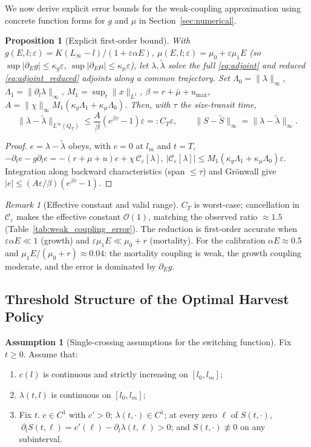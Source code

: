 \documentclass[pdflatex,sn-mathphys-num]{sn-jnl}
\newcommand{\Ord}{\mathcal{O}}
\newcommand{\Qt}{Q_T}
\theoremstyle{thmstyleone}
\newtheorem{proposition}[theorem]{Proposition}
\theoremstyle{definition}
\newtheorem{assumption}[theorem]{Assumption}
\theoremstyle{remark}
\newtheorem{remark}[theorem]{Remark}
\begin{document}
We now derive explicit error bounds for the weak-coupling approximation using concrete function forms for $g$ and $\mu$ in Section~\ref{sec:numerical}.
\begin{proposition}[Explicit first-order bound]\label{prop:wcbound}
With $g(E,l;\varepsilon)=K(L_\infty-l)/(1+\varepsilon\alpha E)$,
$\mu(E,l;\varepsilon)=\mu_0+\varepsilon\mu_1E$ (so $\sup|\partial_E g|\le\kappa_g\varepsilon$,
$\sup|\partial_E\mu|\le\kappa_\mu\varepsilon$), let $\lambda,\tilde\lambda$ solve the
full \eqref{eq:adjoint} and reduced \eqref{eq:adjoint_reduced} adjoints along a
common trajectory. Set $\Lambda_0=\|\lambda\|_\infty$,
$\Lambda_1=\|\partial_l\lambda\|_\infty$, $M_1=\sup_t\|x\|_{L^1}$,
$\beta=r+\bar\mu+u_{\max}$, $A=\|\chi\|_\infty M_1(\kappa_g\Lambda_1+\kappa_\mu\Lambda_0)$.
Then, with $\tau$ the size-transit time,
\[
\|\lambda-\tilde\lambda\|_{L^\infty(\Qt)}\le\frac{A}{\beta}(e^{\beta\tau}-1)\varepsilon=:C_T\varepsilon,
\qquad \|S-\tilde S\|_\infty=\|\lambda-\tilde\lambda\|_\infty .
\]
\end{proposition}
\begin{proof}
$e=\lambda-\tilde\lambda$ obeys, with $e=0$ at $l_m$ and $t=T$,
$-\partial_t e-g\partial_l e=-(r+\mu+u)e+\chi\,\mathcal C_\varepsilon[\lambda]$,
$|\mathcal C_\varepsilon[\lambda]|\le M_1(\kappa_g\Lambda_1+\kappa_\mu\Lambda_0)\varepsilon$.
Integration along backward characteristics (span $\le\tau$) and Gr\"onwall give
$|e|\le(A\varepsilon/\beta)(e^{\beta\tau}-1)$.
\end{proof}
\begin{remark}[Effective constant and valid range]\label{rem:validrange}
$C_T$ is worst-case; cancellation in $\mathcal C_\varepsilon$ makes the effective
constant $\Ord(1)$, matching the observed ratio $\approx1.5$
(Table~\ref{tab:weak_coupling_error}). The reduction is first-order accurate when
$\varepsilon\alpha E\ll1$ (growth) and $\varepsilon\mu_1E\ll\mu_0+r$ (mortality).
For the calibration $\alpha E\approx0.5$ and $\mu_1E/(\mu_0+r)\approx0.04$: the
mortality coupling is weak, the growth coupling moderate, and the error is
dominated by $\partial_E g$.
\end{remark}

\subsection{Threshold Structure of the Optimal Harvest Policy}
\label{subsec:threshold}

\begin{assumption}[Single-crossing assumptions for the switching function]
\label{ass:switching}
Fix $t\ge 0$. Assume that:
\begin{enumerate}[label=(\roman*)]
\item $c(l)$ is continuous and strictly increasing on $[l_0,l_m]$;
\item $\lambda(t,l)$ is continuous on $[l_0,l_m]$;
\item\label{ass:lsc} Fix $t$. $c\in C^1$ with $c'>0$; $\lambda(t,\cdot)\in C^1$; at every zero $\ell$ of
$S(t,\cdot)$, $\ \partial_l S(t,\ell)=c'(\ell)-\partial_l\lambda(t,\ell)>0$; and
$S(t,\cdot)\not\equiv0$ on any subinterval.
\end{enumerate}
\end{assumption}
\end{document}
